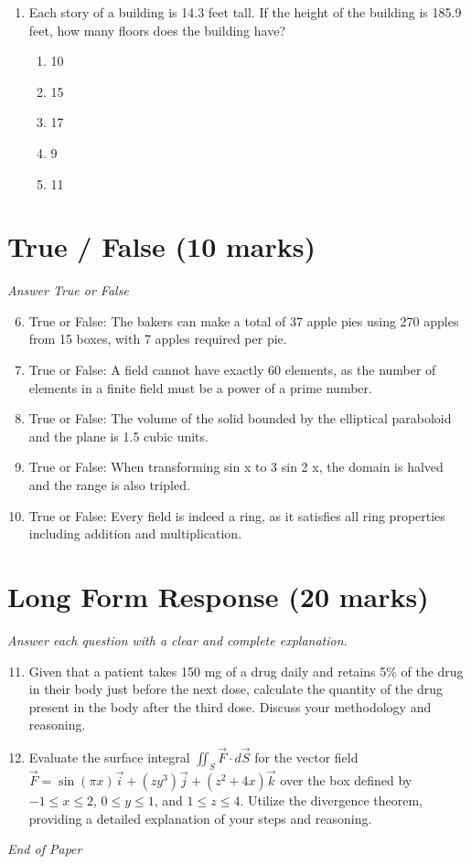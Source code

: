 \documentclass[12pt]{article}
\begin{document}
\begin{enumerate}[label=\arabic*.]
\begin{enumerate}[label=(\alph*)]
    \item 0,1,2,3
    \item 1
    \item 3,4
    \item 0,1,2
\end{enumerate}
\item Each story of a building is 14.3 feet tall. If the height of the building is 185.9 feet, how many floors does the building have?
\begin{enumerate}[label=(\alph*)]
    \item 10
    \item 15
    \item 17
    \item 9
    \item 11
\end{enumerate}
\end{enumerate}

\section*{True / False (10 marks)}
\textit{Answer True or False}
\begin{enumerate}[label=\arabic*.]
\setcounter{enumi}{5}
\item True or False: The bakers can make a total of 37 apple pies using 270 apples from 15 boxes, with 7 apples required per pie.
\item True or False: A field cannot have exactly 60 elements, as the number of elements in a finite field must be a power of a prime number.
\item True or False: The volume of the solid bounded by the elliptical paraboloid and the plane is 1.5 cubic units.
\item True or False: When transforming sin x to 3 sin 2 x, the domain is halved and the range is also tripled.
\item True or False: Every field is indeed a ring, as it satisfies all ring properties including addition and multiplication.
\end{enumerate}

\section*{Long Form Response (20 marks)}
\textit{Answer each question with a clear and complete explanation.}
\begin{enumerate}[label=\arabic*.]
\setcounter{enumi}{10}
\item Given that a patient takes 150 mg of a drug daily and retains 5\% of the drug in their body just before the next dose, calculate the quantity of the drug present in the body after the third dose. Discuss your methodology and reasoning.
\item Evaluate the surface integral $\iint_S \vec{F} \cdot d \vec{S}$ for the vector field $\vec{F} = \sin(\pi x) \vec{i} + (z y^3) \vec{j} + (z^2 + 4 x) \vec{k}$ over the box defined by $-1 \leq x \leq 2$, $0 \leq y \leq 1$, and $1 \leq z \leq 4$. Utilize the divergence theorem, providing a detailed explanation of your steps and reasoning.
\end{enumerate}

\vfill
\noindent\textit{End of Paper}
\end{document}
